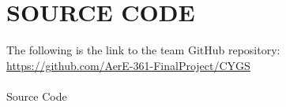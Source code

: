 \documentclass[12pt]{article}
\begin{document}
\newpage



\newpage
\appendix

\section{SOURCE CODE}
The following is the link to the team GitHub repository: \url{https://github.com/AerE-361-FinalProject/CYGS} \\
\\
Source Code

\end{document}
